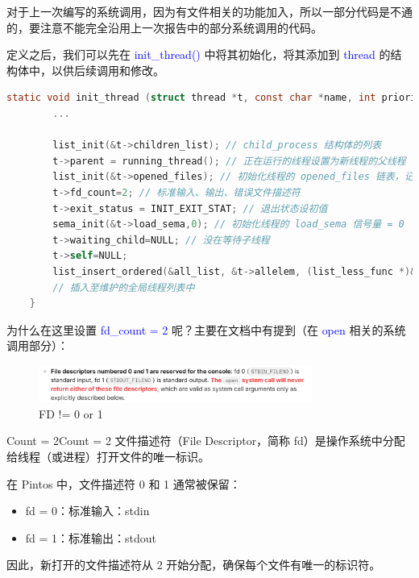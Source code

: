 \documentclass[14pt,a4paper,UTF8,twoside]{article}
\renewcommand{\texttt}[1]{\textcolor{blue}{\ttfamily #1}}
\begin{document}
对于上一次编写的系统调用，因为有文件相关的功能加入，所以一部分代码是不通的，要注意不能完全沿用上一次报告中的部分系统调用的代码。

定义之后，我们可以先在 \texttt{init\_thread()} 中将其初始化，将其添加到 \texttt{thread} 的结构体中，以供后续调用和修改。

\begin{lstlisting}[language=C,title= init\_thread]
    static void init_thread (struct thread *t, const char *name, int priority) {
        ...

        list_init(&t->children_list); // child_process 结构体的列表
        t->parent = running_thread(); // 正在运行的线程设置为新线程的父线程
        list_init(&t->opened_files); // 初始化线程的 opened_files 链表，记录线程打开的所有文件
        t->fd_count=2; // 标准输入、输出、错误文件描述符
        t->exit_status = INIT_EXIT_STAT; // 退出状态设初值
        sema_init(&t->load_sema,0); // 初始化线程的 load_sema 信号量 = 0
        t->waiting_child=NULL; // 没在等待子线程
        t->self=NULL;
        list_insert_ordered(&all_list, &t->allelem, (list_less_func *)&compare_priority, NULL);
        // 插入至维护的全局线程列表中
    }
\end{lstlisting}

为什么在这里设置 \texttt{fd\_count = 2} 呢？主要在文档中有提到（在 \texttt{open} 相关的系统调用部分）：

\begin{figure}[H]
    \centering
    \includegraphics[width=0.8\textwidth]{img6/not01.png}
    \caption{FD != 0 or 1}
    \label{fig:lab6-4}
\end{figure}

\begin{thm}{Count = 2}{Count = 2}
    文件描述符（File Descriptor，简称 fd）是操作系统中分配给线程（或进程）打开文件的唯一标识。
    
    在 Pintos 中，文件描述符 0 和 1 通常被保留：

    \begin{itemize}
        \item fd = 0：标准输入：stdin
        \item fd = 1：标准输出：stdout
    \end{itemize}
    因此，新打开的文件描述符从 2 开始分配，确保每个文件有唯一的标识符。
\end{thm}
\end{document}
